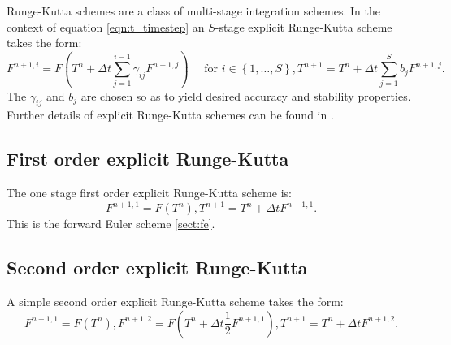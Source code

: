 \documentclass[a4paper]{book}
\begin{document}
Runge-Kutta schemes are a class of multi-stage integration schemes. In the
context of equation \eqref{eqn:t_timestep} an $S$-stage explicit Runge-Kutta
scheme takes the form:
\begin{subequations}
  \begin{equation}
    F^{n + 1,i} = F \left( T^n + \Delta t \sum_{j = 1}^{i - 1} \gamma_{ij} F^{n + 1,j} \right) \quad \textrm{ for } i \in \left\{ 1, \ldots, S \right\},
  \end{equation}
  \begin{equation}
    T^{n + 1} = T^n + \Delta t \sum_{j = 1}^S b_j F^{n + 1,j}.
  \end{equation}
\end{subequations}
The $\gamma_{ij}$ and $b_j$ are chosen so as to yield desired accuracy and
stability properties. Further details of explicit Runge-Kutta schemes can be
found in \citet[section 3.2]{iserles2009}.

\subsection{First order explicit Runge-Kutta}

The one stage first order explicit Runge-Kutta scheme is:
\begin{subequations}
  \begin{equation}
    F^{n + 1,1} = F \left( T^n \right),
  \end{equation}
  \begin{equation}
    T^{n + 1} = T^n + \Delta t F^{n + 1,1}.
  \end{equation}
\end{subequations}
This is the forward Euler scheme \ref{sect:fe}.

\subsection{Second order explicit Runge-Kutta}\label{sect:rk2}

A simple second order explicit Runge-Kutta scheme takes the form:
\begin{subequations}
  \begin{equation}
    F^{n + 1,1} = F \left( T^n \right),
  \end{equation}
  \begin{equation}
    F^{n + 1,2} = F \left( T^n + \Delta t \frac{1}{2} F^{n + 1,1} \right),
  \end{equation}
  \begin{equation}
    T^{n + 1} = T^n + \Delta t F^{n + 1,2}.
  \end{equation}
\end{subequations}
\end{document}
